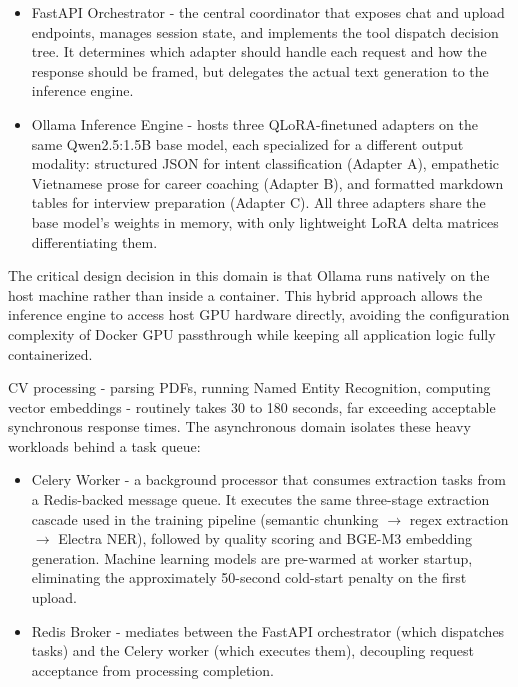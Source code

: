 \documentclass[12pt, a4paper]{report}
\renewcommand{\textit}[1]{\textup{#1}}
\begin{document}
\begin{itemize}
    \item FastAPI Orchestrator - the central coordinator that exposes chat and upload endpoints, manages session state, and implements the tool dispatch decision tree. It determines \textit{which} adapter should handle each request and \textit{how} the response should be framed, but delegates the actual text generation to the inference engine.
    \item Ollama Inference Engine - hosts three QLoRA-finetuned adapters on the same Qwen2.5:1.5B base model, each specialized for a different output modality: structured JSON for intent classification (Adapter A), empathetic Vietnamese prose for career coaching (Adapter B), and formatted markdown tables for interview preparation (Adapter C). All three adapters share the base model's weights in memory, with only lightweight LoRA delta matrices differentiating them.
\end{itemize}

The critical design decision in this domain is that Ollama runs natively on the host machine rather than inside a container. This hybrid approach allows the inference engine to access host GPU hardware directly, avoiding the configuration complexity of Docker GPU passthrough while keeping all application logic fully containerized.

\vspace{0.4cm}
\vspace{0.3cm}

CV processing - parsing PDFs, running Named Entity Recognition, computing vector embeddings - routinely takes 30 to 180 seconds, far exceeding acceptable synchronous response times. The asynchronous domain isolates these heavy workloads behind a task queue:

\begin{itemize}
    \item Celery Worker - a background processor that consumes extraction tasks from a Redis-backed message queue. It executes the same three-stage extraction cascade used in the training pipeline (semantic chunking $\rightarrow$ regex extraction $\rightarrow$ Electra NER), followed by quality scoring and BGE-M3 embedding generation. Machine learning models are pre-warmed at worker startup, eliminating the approximately 50-second cold-start penalty on the first upload.
    \item Redis Broker - mediates between the FastAPI orchestrator (which dispatches tasks) and the Celery worker (which executes them), decoupling request acceptance from processing completion.
\end{itemize}
\end{document}
